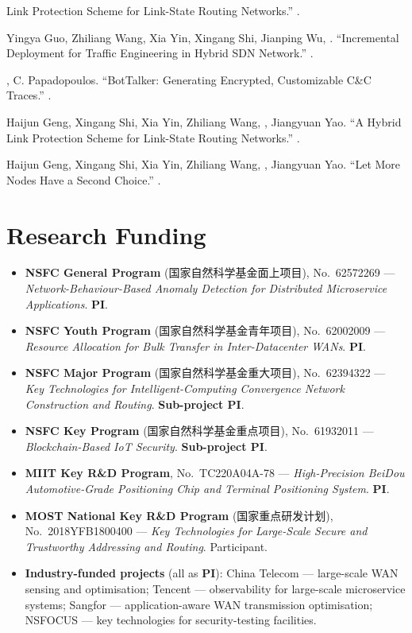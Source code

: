 \documentclass[11pt]{article}
\newcommand{\cn}[1]{#1}
\begin{document}
\begin{publist}
Link Protection Scheme for Link-State Routing Networks.'' .
\item Yingya Guo, Zhiliang Wang, Xia Yin, Xingang Shi, Jianping Wu, .
``Incremental Deployment for Traffic Engineering in Hybrid SDN Network.''
.
\item {}, C. Papadopoulos. ``BotTalker: Generating Encrypted, Customizable
C\&C Traces.'' .
\item Haijun Geng, Xingang Shi, Xia Yin, Zhiliang Wang, , Jiangyuan Yao.
``A Hybrid Link Protection Scheme for Link-State Routing Networks.''
.
\item Haijun Geng, Xingang Shi, Xia Yin, Zhiliang Wang, , Jiangyuan Yao.
``Let More Nodes Have a Second Choice.'' .
\end{publist}

\section{Research Funding}
\begin{itemize}
  \item \textbf{NSFC General Program} (\cn{国家自然科学基金面上项目}), No.~62572269 ---
        \emph{Network-Behaviour-Based Anomaly Detection for Distributed Microservice
        Applications}. \textbf{PI}.
  \item \textbf{NSFC Youth Program} (\cn{国家自然科学基金青年项目}), No.~62002009 ---
        \emph{Resource Allocation for Bulk Transfer in Inter-Datacenter WANs}.
        \textbf{PI}.
  \item \textbf{NSFC Major Program} (\cn{国家自然科学基金重大项目}), No.~62394322 ---
        \emph{Key Technologies for Intelligent-Computing Convergence Network
        Construction and Routing}. \textbf{Sub-project PI}.
  \item \textbf{NSFC Key Program} (\cn{国家自然科学基金重点项目}), No.~61932011 ---
        \emph{Blockchain-Based IoT Security}. \textbf{Sub-project PI}.
  \item \textbf{MIIT Key R\&D Program}, No.~TC220A04A-78 --- \emph{High-Precision
        BeiDou Automotive-Grade Positioning Chip and Terminal Positioning System}.
        \textbf{PI}.
  \item \textbf{MOST National Key R\&D Program} (\cn{国家重点研发计划}), No.~2018YFB1800400
        --- \emph{Key Technologies for Large-Scale Secure and Trustworthy Addressing
        and Routing}. Participant.
  \item \textbf{Industry-funded projects} (all as \textbf{PI}): China Telecom ---
        large-scale WAN sensing and optimisation; Tencent --- observability for
        large-scale microservice systems; Sangfor --- application-aware WAN
        transmission optimisation; NSFOCUS --- key technologies for security-testing
        facilities.
\end{itemize}
\end{document}
